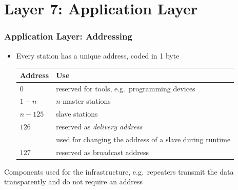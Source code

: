 \documentclass{beamer}
\begin{document}
\section{Layer 7: Application Layer}
\begin{frame}
  \frametitle{Application Layer: Addressing}
  \begin{itemize}
    \item Every station has a unique address, coded in 1 byte
      \center
      \footnotesize
      \begin{tabular}[h]{l|l}
        \textbf{Address}  & \textbf{Use} \\
        \hline
        $0$               & reserved for tools, e.g.\ programming devices \\
        $1 - n$           & $n$ master stations \\
        $n - 125$         & slave stations \\
        $126$             & reserved as \textit{delivery address} \\
                          & used for changing the address of a slave during runtime \\
        $127$             & reserved as broadcast address
      \end{tabular}
  \end{itemize}
  Components used for the infrastructure, e.g.\ repeaters transmit the data transparently
  and do not require an address \\
\end{frame}
\end{document}
